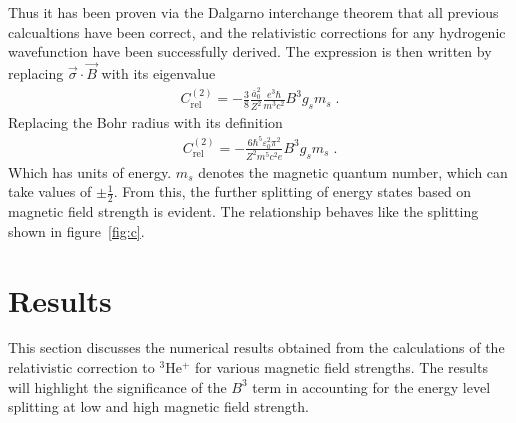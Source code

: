             \noindent Thus it has been proven via the Dalgarno interchange theorem that all previous calcualtions have been correct, and the relativistic corrections for any hydrogenic wavefunction have been successfully derived. The expression is then written by replacing $\vec{\sigma} \cdot \vec{B}$ with its eigenvalue 
            \begin{align}
                C_{\text{rel}}^{(2)} = -\frac{3}{8} \frac{\bar{a}_0^2}{Z^2}\frac{ e^3 \hbar}{ m^3 c^2}B^3g_s m_s\;.
            \end{align}
            \noindent Replacing the Bohr radius with its definition
            \begin{align}
                C_{\text{rel}}^{(2)} = - \frac{6\hbar^5 \varepsilon_0^2 \pi^2}{Z^2 m^5 c^2 e} B^3 g_s m_s\;.
            \end{align}
            \noindent Which has units of energy. $m_s$ denotes the magnetic quantum number, which can take values of $\pm \frac{1}{2}$. From this, the further splitting of energy states based on magnetic field strength is evident. The relationship behaves like the splitting shown in figure~\ref{fig:c}.
    \section{Results}\label{sec:results}
        This section discusses the numerical results obtained from the calculations of the relativistic correction to $^3$He$^+$ for various magnetic field strengths. The results will highlight the significance of the $B^3$ term in accounting for the energy level splitting at low and high magnetic field strength.\\

